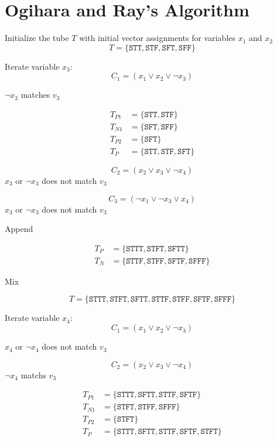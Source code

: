 \section{Ogihara and Ray's Algorithm}

Initialize the tube $T$ with initial vector assignments for variables $x_1$ and $x_2$
\[
	T = \{\texttt{STT}, \texttt{STF}, \texttt{SFT}, \texttt{SFF}\}
\]

\noindent Iterate variable $x_3$:
\[
C_1 = (x_1 \vee x_2 \vee \neg x_3)
\]

\noindent $\neg x_3$ matches $v_3$

\begin{align*}
T_{P1} &= \{\texttt{STT}, \texttt{STF}\}\\
T_{N1} &= \{\texttt{SFT}, \texttt{SFF}\}\\
T_{P2} &= \{\texttt{SFT}\}\\
T_P &= \{\texttt{STT}, \texttt{STF}, \texttt{SFT}\}
\end{align*}

\[
C_2 = (x_2 \vee x_3 \vee \neg x_4)
\]
\noindent $x_3$ or $\neg x_3$ does not match $v_3$

\[
C_3 = (\neg x_1 \vee \neg x_3 \vee x_4)
\]
\noindent $x_3$ or $\neg x_3$ does not match $v_3$

\noindent Append

\begin{align*}
T_P &= \{\texttt{STTT}, \texttt{STFT}, \texttt{SFTT}\}\\
T_N &= \{\texttt{STTF}, \texttt{STFF}, \texttt{SFTF}, \texttt{SFFF}\}
\end{align*}

\noindent Mix

\[
T = \{\texttt{STTT}, \texttt{STFT}, \texttt{SFTT}, \texttt{STTF}, \texttt{STFF}, \texttt{SFTF}, \texttt{SFFF}\}
\]


\noindent Iterate variable $x_4$:
\[
C_1 = (x_1 \vee x_2 \vee \neg x_3)
\]

\noindent $x_4$ or $\neg x_4$ does not match $v_3$

\[
C_2 = (x_2 \vee x_3 \vee \neg x_4)
\]
\noindent $\neg x_4$ matchs $v_3$

\begin{align*}
T_{P1} &= \{\texttt{STTT}, \texttt{SFTT}, \texttt{STTF}, \texttt{SFTF}\}\\
T_{N1} &= \{\texttt{STFT}, \texttt{STFF}, \texttt{SFFF}\}\\
T_{P2} &= \{\texttt{STFT}\}\\
T_P &= \{\texttt{STTT}, \texttt{SFTT}, \texttt{STTF}, \texttt{SFTF}, \texttt{STFT}\}
\end{align*}

